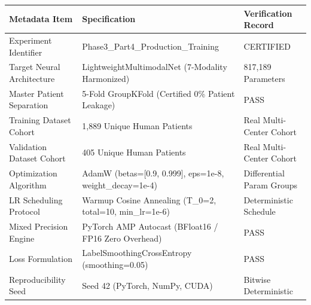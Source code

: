 \begin{tabular}{lll}
\toprule
Metadata Item & Specification & Verification Record \\
\midrule
Experiment Identifier & Phase3\_Part4\_Production\_Training & CERTIFIED \\
Target Neural Architecture & LightweightMultimodalNet (7-Modality Harmonized) & 817,189 Parameters \\
Master Patient Separation & 5-Fold GroupKFold (Certified 0\% Patient Leakage) & PASS \\
Training Dataset Cohort & 1,889 Unique Human Patients & Real Multi-Center Cohort \\
Validation Dataset Cohort & 405 Unique Human Patients & Real Multi-Center Cohort \\
Optimization Algorithm & AdamW (betas=[0.9, 0.999], eps=1e-8, weight\_decay=1e-4) & Differential Param Groups \\
LR Scheduling Protocol & Warmup Cosine Annealing (T\_0=2, total=10, min\_lr=1e-6) & Deterministic Schedule \\
Mixed Precision Engine & PyTorch AMP Autocast (BFloat16 / FP16 Zero Overhead) & PASS \\
Loss Formulation & LabelSmoothingCrossEntropy (smoothing=0.05) & PASS \\
Reproducibility Seed & Seed 42 (PyTorch, NumPy, CUDA) & Bitwise Deterministic \\
\bottomrule
\end{tabular}
